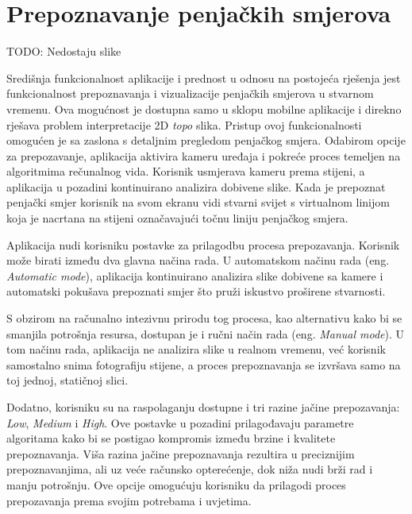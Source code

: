 \section{Prepoznavanje penjačkih smjerova}

TODO: Nedostaju slike

Središnja funkcionalnost aplikacije i prednost u odnosu na postojeća rješenja jest funkcionalnost prepoznavanja i vizualizacije penjačkih smjerova u stvarnom vremenu. Ova mogućnost je dostupna samo u sklopu mobilne aplikacije i direkno rješava problem interpretacije 2D \textit{topo} slika. Pristup ovoj funkcionalnosti omogućen je sa zaslona s detaljnim pregledom penjačkog smjera. Odabirom opcije za prepozavanje, aplikacija aktivira kameru uređaja i pokreće proces temeljen na algoritmima rečunalnog vida. Korisnik usmjerava kameru prema stijeni, a aplikacija u pozadini kontinuirano analizira dobivene slike. Kada je prepoznat penjački smjer korisnik na svom ekranu vidi stvarni svijet s virtualnom linijom koja je nacrtana na stijeni označavajući točnu liniju penjačkog smjera.

Aplikacija nudi korisniku postavke za prilagodbu procesa prepozavanja. Korisnik može birati između dva glavna načina rada. U automatskom načinu rada (eng. \textit{Automatic mode}), aplikacija kontinuirano analizira slike dobivene sa kamere i automatski pokušava prepoznati smjer što pruži iskustvo proširene stvarnosti. 

S obzirom na računalno intezivnu prirodu tog procesa, kao alternativu kako bi se smanjila potrošnja resursa, dostupan je i ručni način rada (eng. \textit{Manual mode}). U tom načinu rada, aplikacija ne analizira slike u realnom vremenu, već korisnik samostalno snima fotografiju stijene, a proces prepoznavanja se izvršava samo na toj jednoj, statičnoj slici. 

Dodatno, korisniku su na raspolaganju dostupne i tri razine jačine prepozavanja: \textit{Low}, \textit{Medium} i \textit{High}. Ove postavke u pozadini prilagođavaju parametre algoritama kako bi se postigao kompromis između brzine i kvalitete prepoznavanja. Viša razina jačine prepoznavanja rezultira u preciznijim prepoznavanjima, ali uz veće računsko opterećenje, dok niža nudi brži rad i manju potrošnju. Ove opcije omogućuju korisniku da prilagodi proces prepozavanja prema svojim potrebama i uvjetima.
